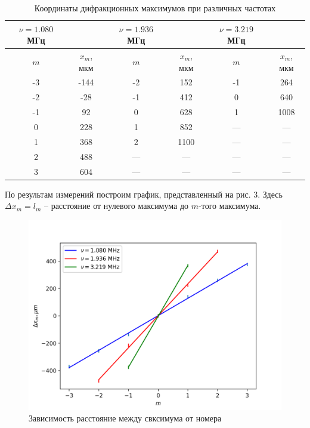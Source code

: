 \documentclass[a4paper,12pt]{article}
\begin{document}
\begin{table}[H]
    \centering
    \caption{Координаты дифракционных максимумов при различных частотах}
    \begin{tabular}{|c|c||c|c||c|c|} \hline
        $\nu = 1.080$ МГц & & $\nu = 1.936$ МГц & & $\nu = 3.219$ МГц & \\ \hline
        $m$ & $x_m$, мкм & $m$ & $x_m$, мкм & $m$ & $x_m$, мкм \\ \hline
        -3 & -144 & -2 & 152 & -1 & 264 \\ \hline 
        -2 & -28 & -1 & 412 & 0 & 640 \\ \hline
        -1 & 92 & 0 & 628 & 1 & 1008 \\ \hline
        0 & 228 & 1 & 852 & --- & --- \\ \hline
        1 & 368 & 2 & 1100 & --- &--- \\ \hline
        2 & 488 & ---& ---& ---&--- \\ \hline
        3 & 604 &--- &--- &--- &--- \\ \hline
    \end{tabular}
\end{table}

\noindent
По результам измерений построим график, представленный на рис. 3. Здесь $\Delta x_m = l_m$ -- расстояние от нулевого максимума до $m$-того максимума.

\begin{figure}[H]
    \centering
    \includegraphics[scale=0.9]{1.png}
    \caption{Зависимость расстояние между свксимума от номера}
\end{figure}
\end{document}
